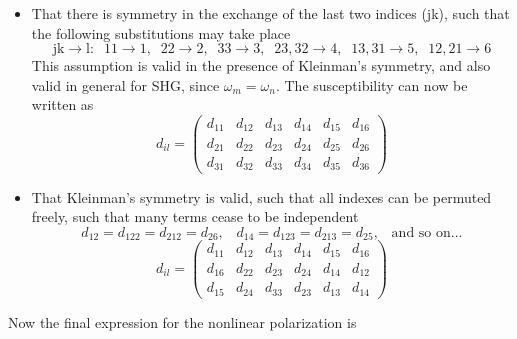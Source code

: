 \begin{itemize}
    \item That there is symmetry in the exchange of the last two indices (jk), such that the following substitutions may take place
    \begin{equation*}
       \text{jk}\rightarrow\text{l}:\;\;11\rightarrow1,\;\;22\rightarrow2,\;\;33\rightarrow3,\;\;23,32\rightarrow4,\;\;13,31\rightarrow5,\;\;12,21\rightarrow6
    \end{equation*}
    This assumption is valid in the presence of Kleinman's symmetry, and also valid in general for SHG, since $\omega_m=\omega_n$. The susceptibility can now be written as
    \begin{equation*}
        d_{il}=\begin{pmatrix}
            d_{11} & d_{12} & d_{13} & d_{14} & d_{15} & d_{16}\\
            d_{21} & d_{22} & d_{23} & d_{24} & d_{25} & d_{26}\\
            d_{31} & d_{32} & d_{33} & d_{34} & d_{35} & d_{36}
        \end{pmatrix}
    \end{equation*}
    \item That Kleinman's symmetry is valid, such that all indexes can be permuted freely, such that many terms cease to be independent
    \begin{equation*}
        d_{12}=d_{122}=d_{212}=d_{26},\;\;\;d_{14}=d_{123}=d_{213}=d_{25},\;\;\;\text{and so on...}
    \end{equation*}
    \begin{equation*}
        d_{il}=\begin{pmatrix}
            d_{11} & d_{12} & d_{13} & d_{14} & d_{15} & d_{16}\\
            d_{16} & d_{22} & d_{23} & d_{24} & d_{14} & d_{12}\\
            d_{15} & d_{24} & d_{33} & d_{23} & d_{13} & d_{14}
        \end{pmatrix}
    \end{equation*}
\end{itemize}
Now the final expression for the nonlinear polarization is
